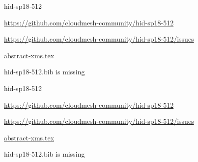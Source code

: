 \begin{IU}

hid-sp18-512

\url{https://github.com/cloudmesh-community/hid-sp18-512}

\url{https://github.com/cloudmesh-community/hid-sp18-512/issues}

\href{https://github.com/cloudmesh-community/hid-sp18-512/blob/master//technology/abstract-xms.tex}{abstract-xms.tex}

hid-sp18-512.bib is missing

\end{IU}


\begin{IU}

hid-sp18-512

\url{https://github.com/cloudmesh-community/hid-sp18-512}

\url{https://github.com/cloudmesh-community/hid-sp18-512/issues}

\href{https://github.com/cloudmesh-community/hid-sp18-512/blob/master//technology/abstract-xms.tex}{abstract-xms.tex}

hid-sp18-512.bib is missing

\end{IU}


